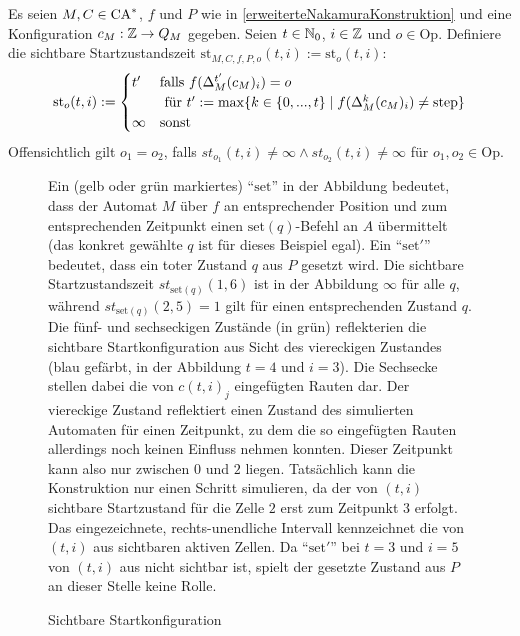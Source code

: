 \begin{definition}
    Es seien $M, C \in \textrm{CA}^*$, $f$ und $P$ wie in \cref{erweiterteNakamuraKonstruktion} und eine Konfiguration $c_M: \mathbb{Z} \to Q_M$ gegeben.
    Seien $t \in \mathbb{N}_0$, $i \in \mathbb{Z}$ und $o \in \mathrm{Op}$.
    Definiere die sichtbare Startzustandszeit $\mathrm{st}_{M, C, f, P, o}(t, i) := \mathrm{st}_o(t, i)$:
    \[
        \mathrm{st}_o(t, i) :=
        \begin{cases}
            t' &
                \text{falls } f(\Delta_M^{t'}(c_M)_i) = o \\
                & \text{ für } t' := \max \{ { k \in \{ {0, ..., t} \} } \; | \; { f(\Delta_M^{k}(c_M)_i) \neq \mathrm{step} } \}
            \\
            \infty & \text{sonst}
        \end{cases}
    \]
    Offensichtlich gilt $o_1 = o_2$, falls $st_{o_1}(t, i) \neq \infty \land st_{o_2}(t, i) \neq \infty$ für $o_1, o_2 \in \mathrm{Op}$.
    
    \newcommand{\setq}{\scriptsize $\mathrm{set}$}
    \newcommand{\setp}{\scriptsize $\mathrm{set}'$}
    
    \begin{figure}[h!]
        \begin{center}
        
        \end{center}
        \caption{Sichtbare Startkonfiguration}
        \label{fig:SichtbareStartkonfiguration}
        
        Ein (gelb oder grün markiertes) \enquote{$\mathrm{set}$} in der Abbildung bedeutet,
        dass der Automat $M$ über $f$ an entsprechender Position und zum entsprechenden Zeitpunkt
        einen $\mathrm{set}(q)$-Befehl an $A$ übermittelt (das konkret gewählte $q$ ist für dieses Beispiel egal).
        Ein \enquote{$\mathrm{set}'$} bedeutet, dass ein toter Zustand $q$ aus $P$ gesetzt wird.
        Die sichtbare Startzustandszeit $st_{\mathrm{set}(q)}(1, 6)$ ist in der Abbildung $\infty$ für alle $q$,
        während $st_{\mathrm{set}(q)}(2, 5) = 1$ gilt für einen entsprechenden Zustand $q$.
        Die fünf- und sechseckigen Zustände (in grün) reflekterien die sichtbare Startkonfiguration aus
        Sicht des viereckigen Zustandes (blau gefärbt, in der Abbildung $t = 4$ und $i = 3$).
        Die Sechsecke stellen dabei die von $c(t,i)_j$ eingefügten Rauten dar.
        Der viereckige Zustand reflektiert einen Zustand des simulierten Automaten für einen Zeitpunkt,
        zu dem die so eingefügten Rauten allerdings noch keinen Einfluss nehmen konnten.
        Dieser Zeitpunkt kann also nur zwischen $0$ und $2$ liegen. Tatsächlich kann die Konstruktion
        nur einen Schritt simulieren, da der von $(t, i)$ sichtbare Startzustand für die Zelle $2$ erst zum Zeitpunkt $3$ erfolgt.
        Das eingezeichnete, rechts-unendliche Intervall kennzeichnet die von $(t, i)$ aus sichtbaren aktiven Zellen.
        Da \enquote{$\mathrm{set}'$} bei $t = 3$ und $i = 5$ von $(t, i)$ aus nicht sichtbar ist,
        spielt der gesetzte Zustand aus $P$ an dieser Stelle keine Rolle.
        

\end{figure}
\end{definition}
